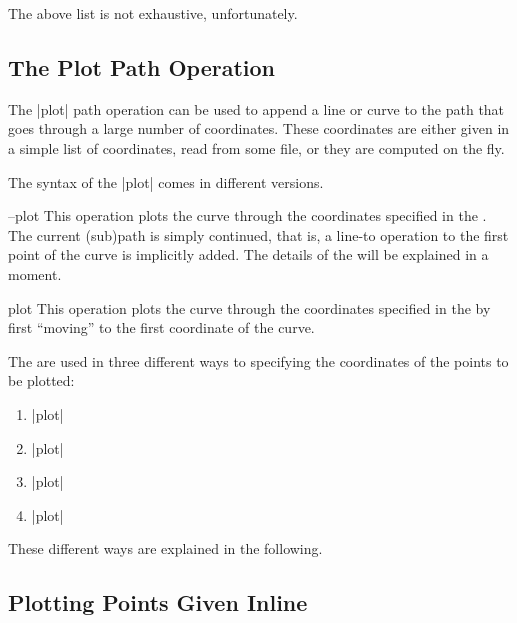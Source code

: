 The above list is not exhaustive, unfortunately.


\subsection{The Plot Path Operation}

The |plot| path operation can be used to append a line or curve to the path
that goes through a large number of coordinates. These coordinates are
either given in a simple list of coordinates, read from some file, or
they are computed on the fly.

The syntax of the |plot| comes in different versions.

\begin{pathoperation}{--plot}{}
  This operation plots the curve through the coordinates specified in
  the . The current (sub)path is simply
  continued, that is, a line-to operation to the first point of the
  curve is implicitly added. The details of the   will be explained in a moment.
\end{pathoperation}

\begin{pathoperation}{plot}{}
  This operation plots the curve through the coordinates specified in
  the  by first ``moving'' to the first
  coordinate of the curve.
\end{pathoperation}

The  are used in three different ways to
specifying the coordinates of the points to be plotted:

\begin{enumerate}
\item
  \opt{|--|}|plot|
\item
  \opt{|--|}|plot|
\item
  \opt{|--|}|plot|
\item
  \opt{|--|}|plot|
\end{enumerate}

These different ways are explained in the following.


\subsection{Plotting Points Given Inline}

